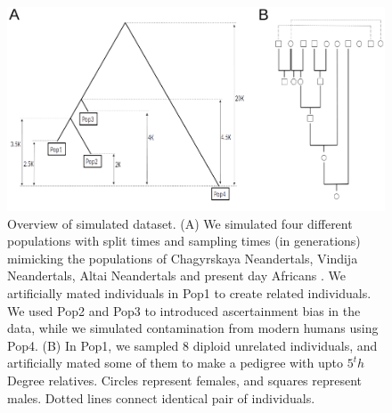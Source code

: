 \documentclass[12pt, letterpaper]{article}
\begin{document}
\begin{figure}[h!]
    \includegraphics[width=18cm]{plots/inkscape_finalImg/pedigree_both.png}
    \centering
    \caption{Overview of simulated dataset. (A) We simulated four different populations with split times and sampling times (in generations) mimicking the populations of Chagyrskaya Neandertals, Vindija Neandertals, Altai Neandertals and present day Africans \cite{mafessoni_high-coverage_2020}. We artificially mated individuals in Pop1 to create related individuals. We used Pop2 and Pop3 to introduced ascertainment bias in the data, while we simulated contamination from modern humans using Pop4. (B) In Pop1, we sampled 8 diploid unrelated individuals, and artificially mated some of them to make a pedigree with upto $5^th$ Degree relatives. Circles represent females, and squares represent males. Dotted lines connect identical pair of individuals.}
    \label{figS10:pedigree}
    
\end{figure}
\end{document}
